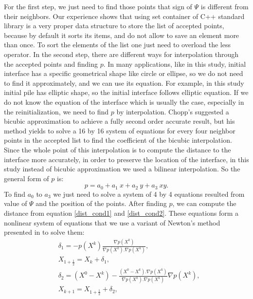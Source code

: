\documentclass[letterpaper,10pt]{article}
\begin{document}
For the first step, we just need to find those points that sign of $\varPsi$ is different from their neighbors. Our experience shows that using set container of C++ standard library is a very proper data structure to store the list of accepted points, because by default it sorts its items, and do not allow to save an element more than once. To sort the elements of the list one just need to overload the less operator.
In the second step, there are different ways for interpolation through the accepted points and finding $p$. In many applications, like in this study, initial interface has a specific geometrical shape like circle or ellipse, so we do not need to find it approximately, and we can use its equation. For example, in this study initial pile has elliptic shape, so the initial interface follows elliptic equation. If we do not know the equation of the interface which is usually the case, especially in the reinitialization, we need to find $p$ by interpolation. Chopp's suggested a bicubic approximation \cite{Chopp2001} to achieve a fully second order accurate  result, but his method yields to solve a 16 by 16 system of equations for every four neighbor points in the accepted list to find the coefficient of the bicubic interpolation. Since the whole point of this interpolation is to compute the distance to the interface more accurately, in order to preserve the location of the interface, in this study instead of bicubic approximation we used a bilinear interpolation. So the general form of $p$ is:
\begin{equation}\label{interpolation}
p=a_0+a_1 \ x+ a_2 \ y+ a_3 \ xy.
\end{equation} 
To find $a_0$ to $a_3$ we just need to solve a system of 4 by 4 equations resulted from value of $\varPsi$ and the position of the points. After finding $p$, we can compute the distance from equation \eqref{dist_cond1} and \eqref{dist_cond2}. These equations form a nonlinear system of equations that we use a variant of Newton's method presented in \cite{Chopp2001} to solve them:
\begin{subequations}
\label{eqnewton}
\begin{align}
&\delta_1=-p(X^k)\frac{\nabla p(X^k)}{\nabla p(X^k).\nabla p(X^k)},\\
& X_{1+\frac{1}{2}}=X_k+\delta_1,\\
& \delta_2=(X^0-X^k)-\frac{(X^0-X^k).\nabla p(X^k)}{\nabla p(X^k).\nabla p(X^k)}\nabla p(X^k),\\
&X_{k+1}=X_{1+\frac{1}{2}}+\delta_2,
\end{align}
\end{subequations}
\end{document}
